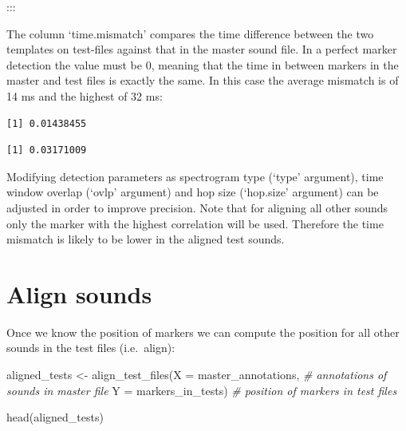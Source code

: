 \documentclass[
  letterpaper,
  DIV=11,
  numbers=noendperiod]{scrartcl}
\newenvironment{Shaded}{\begin{snugshade}}{\end{snugshade}}
\newcommand{\AttributeTok}[1]{\textcolor[rgb]{0.49,0.56,0.16}{#1}}
\newcommand{\CommentTok}[1]{\textcolor[rgb]{0.38,0.63,0.69}{\textit{#1}}}
\newcommand{\ConstantTok}[1]{\textcolor[rgb]{0.53,0.00,0.00}{#1}}
\newcommand{\FunctionTok}[1]{\textcolor[rgb]{0.02,0.16,0.49}{#1}}
\newcommand{\NormalTok}[1]{\textcolor[rgb]{0.00,0.44,0.13}{#1}}
\newcommand{\OtherTok}[1]{\textcolor[rgb]{0.00,0.44,0.13}{#1}}
\newcommand{\SpecialCharTok}[1]{\textcolor[rgb]{0.25,0.44,0.63}{#1}}
\begin{document}
:::

The column `time.mismatch' compares the time difference between the two
templates on test-files against that in the master sound file. In a
perfect marker detection the value must be 0, meaning that the time in
between markers in the master and test files is exactly the same. In
this case the average mismatch is of 14 ms and the highest of 32 ms:

\begin{Shaded}
\end{Shaded}

\begin{verbatim}
[1] 0.01438455
\end{verbatim}

\begin{Shaded}
\end{Shaded}

\begin{verbatim}
[1] 0.03171009
\end{verbatim}

Modifying detection parameters as spectrogram type (`type' argument),
time window overlap (`ovlp' argument) and hop size (`hop.size' argument)
can be adjusted in order to improve precision. Note that for aligning
all other sounds only the marker with the highest correlation will be
used. Therefore the time mismatch is likely to be lower in the aligned
test sounds.

\hypertarget{align-sounds}{%
\section{Align sounds}\label{align-sounds}}

Once we know the position of markers we can compute the position for all
other sounds in the test files (i.e.~align):

\begin{Shaded}
\begin{Highlighting}[numbers=left,,]
\NormalTok{aligned\_tests }\OtherTok{\textless{}{-}}
    \FunctionTok{align\_test\_files}\NormalTok{(}\AttributeTok{X =}\NormalTok{ master\_annotations, }\CommentTok{\# annotations of sounds in master file}
                     \AttributeTok{Y =}\NormalTok{ markers\_in\_tests) }\CommentTok{\# position of markers in test files}
                    

\FunctionTok{head}\NormalTok{(aligned\_tests)}
\end{Highlighting}
\end{Shaded}
\end{document}

